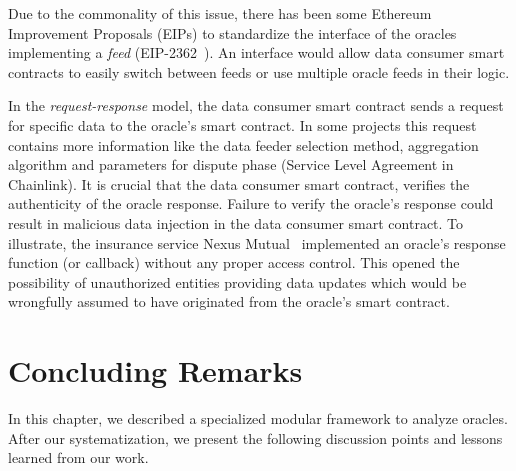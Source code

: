 Due to the commonality of this issue, there has been some Ethereum Improvement Proposals (EIPs) to standardize the interface of the oracles implementing a \textit{feed} (\eg EIP-2362~\cite{eip2362}). An interface would allow data consumer smart contracts to easily switch between feeds or use multiple oracle feeds in their logic. 

In the \textit{request-response} model, the data consumer smart contract sends a request for specific data to the oracle's smart contract. In some projects this request contains more information like the data feeder selection method, aggregation algorithm and parameters for dispute phase (\eg Service Level Agreement in Chainlink). It is crucial that the data consumer smart contract, verifies the authenticity of the oracle response. Failure to verify the oracle's response could result in malicious data injection in the data consumer smart contract. To illustrate, the insurance service Nexus Mutual~\cite{nexusmutualbug} implemented an oracle's response function (or callback) without any proper access control. This opened the possibility of unauthorized entities providing data updates which would be wrongfully assumed to have originated from the oracle's smart contract. 




\section{Concluding Remarks}
In this chapter, we described a specialized modular framework to analyze oracles. After our systematization, we present the following discussion points and lessons learned from our work. 

